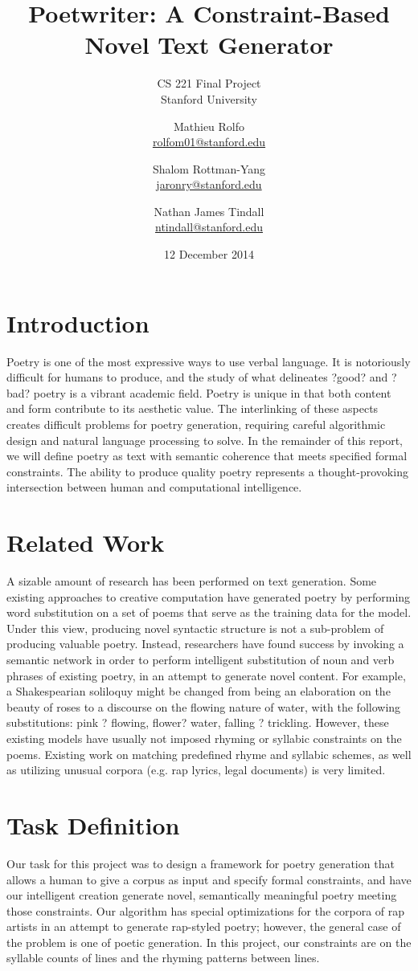 \documentclass[10pt,twocolumn]{article}
\title{Poetwriter: A Constraint-Based Novel Text Generator}
\subtitle{
	CS 221 Final Project\\
	Stanford University
	}
\author{
	Mathieu Rolfo\\
	\href{mailto:rolfom01@stanford.edu}{rolfom01@stanford.edu}
  \and
  	Shalom Rottman-Yang\\
	\href{mailto:jaronry@stanford.edu}{jaronry@stanford.edu}
  \and
  	Nathan James Tindall\\
	\href{mailto:ntindall@stanford.edu}{ntindall@stanford.edu}
}
\date{12 December 2014}
\begin{document}
\maketitle

\section{Introduction}
Poetry is one of the most expressive ways to use verbal language. It is notoriously difficult for humans to produce, and the study of what delineates ?good? and ?bad? poetry is a vibrant academic field. Poetry is unique in that both content and form contribute to its aesthetic value. The interlinking of these aspects creates difficult problems for poetry generation, requiring careful algorithmic design and natural language processing to solve. In the remainder of this report, we will define poetry as text with semantic coherence that meets specified formal constraints. The ability to produce quality poetry represents a thought-provoking intersection between human and computational intelligence.

\section{Related Work}
A sizable amount of research has been performed on text generation. Some existing approaches to creative computation have generated poetry by performing word substitution on a set of poems that serve as the training data for the model. Under this view, producing novel syntactic structure is not a sub-problem of producing valuable poetry. Instead, researchers have found success by invoking a semantic network in order to perform intelligent substitution of noun and verb phrases of existing poetry, in an attempt to generate novel content. For example, a Shakespearian soliloquy might be changed from being an elaboration on the beauty of roses to a discourse on the flowing nature of water, with the following substitutions: pink ? flowing, flower? water, falling ? trickling. However, these existing models have usually not imposed rhyming or syllabic constraints on the poems. Existing work on matching predefined rhyme and syllabic schemes, as well as utilizing unusual corpora (e.g. rap lyrics, legal documents) is very limited.

\section{Task Definition}
Our task for this project was to design a framework for poetry generation that allows a human to give a corpus as input and specify formal constraints, and have our intelligent creation generate novel, semantically meaningful poetry meeting those constraints. Our algorithm has special optimizations for the corpora of rap artists in an attempt to generate rap-styled poetry; however, the general case of the problem is one of poetic generation. In this project, our constraints are on the syllable counts of lines and the rhyming patterns between lines. 
\end{document}
